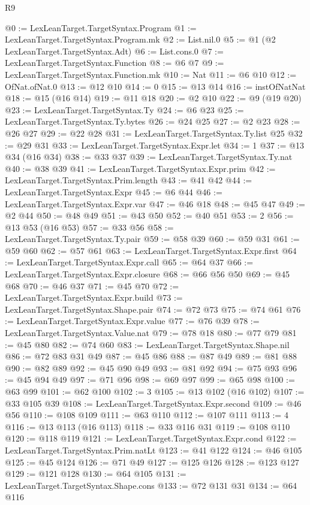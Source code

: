 \begin{lexlean}{R9}
\begin{coremodule}
@0 := LexLeanTarget.TargetSyntax.Program
@1 := LexLeanTarget.TargetSyntax.Program.mk
@2 := List.nil.{0}
@5 := @1 (@2 LexLeanTarget.TargetSyntax.Adt)
@6 := List.cons.{0}
@7 := LexLeanTarget.TargetSyntax.Function
@8 := @6 @7
@9 := LexLeanTarget.TargetSyntax.Function.mk
@10 := Nat
@11 := @6 @10
@12 := OfNat.ofNat.{0}
@13 := @12 @10
@14 := 0
@15 := @13 @14
@16 := instOfNatNat
@18 := @15 (@16 @14)
@19 := @11 @18
@20 := @2 @10
@22 := @9 (@19 @20)
@23 := LexLeanTarget.TargetSyntax.Ty
@24 := @6 @23
@25 := LexLeanTarget.TargetSyntax.Ty.bytes
@26 := @24 @25
@27 := @2 @23
@28 := @26 @27
@29 := @22 @28
@31 := LexLeanTarget.TargetSyntax.Ty.list @25
@32 := @29 @31
@33 := LexLeanTarget.TargetSyntax.Expr.let
@34 := 1
@37 := @13 @34 (@16 @34)
@38 := @33 @37
@39 := LexLeanTarget.TargetSyntax.Ty.nat
@40 := @38 @39
@41 := LexLeanTarget.TargetSyntax.Expr.prim
@42 := LexLeanTarget.TargetSyntax.Prim.length
@43 := @41 @42
@44 := LexLeanTarget.TargetSyntax.Expr
@45 := @6 @44
@46 := LexLeanTarget.TargetSyntax.Expr.var
@47 := @46 @18
@48 := @45 @47
@49 := @2 @44
@50 := @48 @49
@51 := @43 @50
@52 := @40 @51
@53 := 2
@56 := @13 @53 (@16 @53)
@57 := @33 @56
@58 := LexLeanTarget.TargetSyntax.Ty.pair
@59 := @58 @39
@60 := @59 @31
@61 := @59 @60
@62 := @57 @61
@63 := LexLeanTarget.TargetSyntax.Expr.first
@64 := LexLeanTarget.TargetSyntax.Expr.call
@65 := @64 @37
@66 := LexLeanTarget.TargetSyntax.Expr.closure
@68 := @66 @56 @50
@69 := @45 @68
@70 := @46 @37
@71 := @45 @70
@72 := LexLeanTarget.TargetSyntax.Expr.build
@73 := LexLeanTarget.TargetSyntax.Shape.pair
@74 := @72 @73
@75 := @74 @61
@76 := LexLeanTarget.TargetSyntax.Expr.value
@77 := @76 @39
@78 := LexLeanTarget.TargetSyntax.Value.nat
@79 := @78 @18
@80 := @77 @79
@81 := @45 @80
@82 := @74 @60
@83 := LexLeanTarget.TargetSyntax.Shape.nil
@86 := @72 @83 @31 @49
@87 := @45 @86
@88 := @87 @49
@89 := @81 @88
@90 := @82 @89
@92 := @45 @90 @49
@93 := @81 @92
@94 := @75 @93
@96 := @45 @94 @49
@97 := @71 @96
@98 := @69 @97
@99 := @65 @98
@100 := @63 @99
@101 := @62 @100
@102 := 3
@105 := @13 @102 (@16 @102)
@107 := @33 @105 @39
@108 := LexLeanTarget.TargetSyntax.Expr.second
@109 := @46 @56
@110 := @108 @109
@111 := @63 @110
@112 := @107 @111
@113 := 4
@116 := @13 @113 (@16 @113)
@118 := @33 @116 @31
@119 := @108 @110
@120 := @118 @119
@121 := LexLeanTarget.TargetSyntax.Expr.cond
@122 := LexLeanTarget.TargetSyntax.Prim.natLt
@123 := @41 @122
@124 := @46 @105
@125 := @45 @124
@126 := @71 @49
@127 := @125 @126
@128 := @123 @127
@129 := @121 @128
@130 := @64 @105
@131 := LexLeanTarget.TargetSyntax.Shape.cons
@133 := @72 @131 @31
@134 := @64 @116

\end{coremodule}
\end{lexlean}
